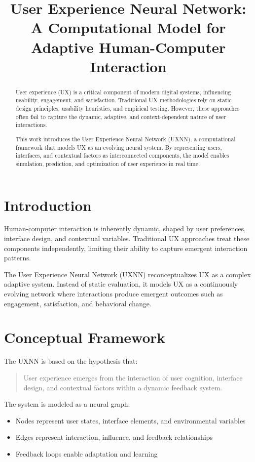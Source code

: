 \documentclass[12pt]{article}
\title{\textbf{User Experience Neural Network: \\ A Computational Model for Adaptive Human-Computer Interaction}}
\author{}
\date{}
\begin{document}
\maketitle

\begin{abstract}
User experience (UX) is a critical component of modern digital systems, influencing usability, engagement, and satisfaction. Traditional UX methodologies rely on static design principles, usability heuristics, and empirical testing. However, these approaches often fail to capture the dynamic, adaptive, and context-dependent nature of user interactions.

This work introduces the User Experience Neural Network (UXNN), a computational framework that models UX as an evolving neural system. By representing users, interfaces, and contextual factors as interconnected components, the model enables simulation, prediction, and optimization of user experience in real time.
\end{abstract}

\section{Introduction}

Human-computer interaction is inherently dynamic, shaped by user preferences, interface design, and contextual variables. Traditional UX approaches treat these components independently, limiting their ability to capture emergent interaction patterns.

The User Experience Neural Network (UXNN) reconceptualizes UX as a complex adaptive system. Instead of static evaluation, it models UX as a continuously evolving network where interactions produce emergent outcomes such as engagement, satisfaction, and behavioral change.

\section{Conceptual Framework}

The UXNN is based on the hypothesis that:

\begin{quote}
User experience emerges from the interaction of user cognition, interface design, and contextual factors within a dynamic feedback system.
\end{quote}

The system is modeled as a neural graph:

\begin{itemize}
\item Nodes represent user states, interface elements, and environmental variables
\item Edges represent interaction, influence, and feedback relationships
\item Feedback loops enable adaptation and learning
\end{itemize}
\end{document}
